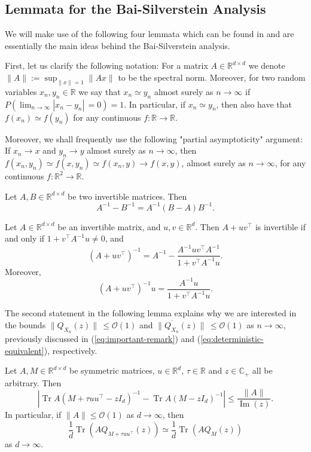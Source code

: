 \documentclass{article}
\begin{document}
\subsection{Lemmata for the Bai-Silverstein Analysis}
We will make use of the following four lemmata which can be found in \cite{couillet} and are essentially the main ideas behind the Bai-Silverstein analysis.
\bigskip
\par
First, let us clarify the following notation: For a matrix $A\in\mathbb{R}^{d\times d}$ we denote $\|A\|:=\sup_{\|x\|=1}\|Ax\|$ to be the spectral norm. Moreover, for two random variables $x_n,y_n\in\mathbb{R}$ we say that $x_n\simeq y_n$ almost surely as $n\to\infty$ if $P\left(\lim_{n\to\infty}|x_n-y_n|\,=0\right)=1$. In particular, if $x_n\simeq y_n$, then also have that $f(x_n)\simeq f(y_n)$ for any continuous $f:\mathbb{R}\to\mathbb{R}$.
\par
Moreover, we shall frequently use the following "partial asymptoticity" argument: If $x_n\to x$ and $y_n\to y$ almost surely as $n\to\infty$, then $f(x_n,y_n)\simeq f(x,y_n)\simeq f(x_n,y)\to f(x,y)$, almost surely as $n\to\infty$, for any continuous $f:\mathbb{R}^2\to\mathbb{R}$.
\bigskip
\\
\begin{lemma}\label{thm:resolvent}
Let $A,B\in\mathbb{R}^{d\times d}$ be two invertible matrices. Then
$$A^{-1}-B^{-1}=A^{-1}(B-A)B^{-1}.$$
\end{lemma}
\bigskip
\noindent
\begin{lemma}\label{thm:SM}
Let $A\in\mathbb{R}^{d\times d}$ be an invertible matrix, and $u,v\in\mathbb{R}^d$. Then $A+uv^\top$ is invertible if and only if $1+v^\top A^{-1}u\neq0$, and
$$(A+uv^\top)^{-1}=A^{-1}-\frac{A^{-1}uv^\top A^{-1}}{1+v^\top A^{-1}u}.$$
Moreover,
$$(A+uv^\top)^{-1}u=\frac{A^{-1}u}{1+v^\top A^{-1}u}.$$
\end{lemma}
\bigskip
\par
The second statement in the following lemma explains why we are interested in the bounds $\|Q_{X_n}(z)\|\,\leq\mathcal{O}(1)$ and $\|\overline{Q_{X_n}}(z)\|\,\leq\mathcal{O}(1)$ as $n\to\infty$, previously discussed in (\ref{eq:important-remark}) and (\ref{eq:deterministic-equivalent}), respectively.
\bigskip
\noindent
\begin{lemma}\label{thm:rank-1-perturbation}
Let $A,M\in\mathbb{R}^{d\times d}$ be symmetric matrices, $u\in\mathbb{R}^d$, $\tau\in\mathbb{R}$ and $z\in\mathbb{C}_+$ all be arbitrary. Then
$$|\operatorname{Tr}A(M+\tau uu^\top-zI_d)^{-1}-\operatorname{Tr}A(M-zI_d)^{-1}|\leq\frac{\|A\|}{\operatorname{Im}(z)}.$$
In particular, if $\|A\|\leq\mathcal{O}(1)$ as $d\to\infty$, then
$$\frac{1}{d}\operatorname{Tr}\left(AQ_{M+\tau uu^\top}(z)\right)\simeq\frac{1}{d}\operatorname{Tr}\left(AQ_M(z)\right)$$
as $d\to\infty$.
\end{lemma}
\end{document}
